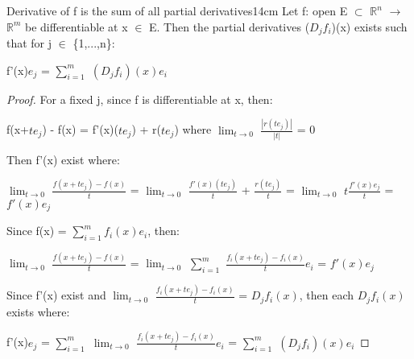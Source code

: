     \vspace{0.5cm}



    \begin{wtheorem}{Derivative of f is the sum of all partial derivatives}{14cm}
        Let f: open E $\subset$ $\mathbb{R}^n$ $\rightarrow$ $\mathbb{R}^m$
        be differentiable at x $\in$ E. Then the partial derivatives
        ($D_jf_i$)(x) exists such that for j $\in$ \{1,...,n\}:

        \hspace{0.5cm}
        f'(x)$e_j$ = $\sum_{i=1}^m$ $(D_jf_i)(x)e_i$
    \end{wtheorem}

    \begin{proof}
        For a fixed j, since f is differentiable at x, then:

        \hspace{0.5cm}
        f(x+$te_j$) - f(x) = f'(x)($te_j$) + r($te_j$)
        \hspace{1cm}
        where $\lim_{t \rightarrow 0}$ $\frac{|r(te_j)|}{|t|}$ = 0

        Then f'(x) exist where:

        \hspace{0.5cm}
        $\lim_{t \rightarrow 0}$ $\frac{f(x+te_j) - f(x)}{t}$
        = $\lim_{t \rightarrow 0}$ $\frac{f'(x)(te_j)}{t}$ + $\frac{r(te_j)}{t}$
        = $\lim_{t \rightarrow 0}$ $t\frac{f'(x)e_j}{t}$
        = $f'(x)e_j$

        Since f(x) = $\sum_{i=1}^m f_i(x)e_i$, then:

        \hspace{0.5cm}
        $\lim_{t \rightarrow 0}$ $\frac{f(x+te_j) - f(x)}{t}$
        = $\lim_{t \rightarrow 0}$
            $\sum_{i=1}^m$ $\frac{f_i(x+te_j) - f_i(x)}{t}e_i$
        = $f'(x)e_j$

        Since f'(x) exist and
        $\lim_{t \rightarrow 0}$ $\frac{f_i(x+te_j) - f_i(x)}{t}$ = $D_jf_i(x)$,
        then each $D_jf_i(x)$ exists where:
        
        \hspace{0.5cm}
        f'(x)$e_j$
        = $\sum_{i=1}^m$ $\lim_{t \rightarrow 0}$
            $\frac{f_i(x+te_j) - f_i(x)}{t}e_i$
        = $\sum_{i=1}^m$ $(D_jf_i)(x)e_i$
    \end{proof}

    \newpage



